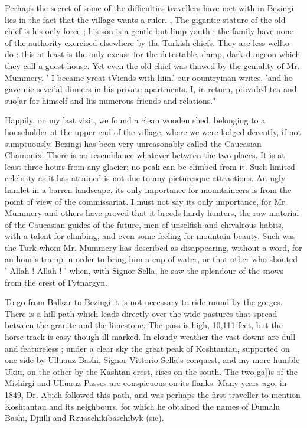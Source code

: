 \documentclass[25pt, a4paper]{article}
\begin{document}
	Perhaps the secret of some of the difficulties travellers have met with in Bezingi lies in the fact that the village wants a ruler. , The gigantic stature of the old chief is his only force ; his son is a gentle but limp youth ; the family have none of the authority exercised elsewhere by the Turkish chiefs. They are less wellto- do : this at least is the only excuse for the detestable, damp, dark dungeon which they call a guest-house. Yet even the old chief was thawed by the geniality of Mr. Mummery. ' I became yreat tViends with liiin.' our oountryinan writes, 'and ho gave nie sevei'al dinners in liis private apartments. I, in return, provided tea and suo[ar for himself and liis numerous friends and relations."
	
	Happily, on my last visit, we found a clean wooden shed, belonging to a householder at the upper end of the village, where we were lodged decently, if not sumptuously. Bezingi has been very unreasonably called the Caucasian Chamonix. There is no resemblance whatever between the two places. It is at least three hours from any glacier; no peak can be climbed from it. Such limited celebrity as it has attained is not due to any picturesque attractions. An ugly hamlet in a barren landscape, its only importance for mountaineers is from the point of view of the commissariat. I must not say its only importance, for Mr. Mummery and others have proved that it breeds hardy hunters, the raw material of the Caucasian guides of the future, men of unselfish and chivalrous habits, with a talent for climbing, and even some feeling for mountain beauty. Such was the Turk whom Mr. Mummery has described as disappearing, without a word, for an hour's tramp in order to bring him a cup of water, or that other who shouted ' Allah ! Allah ! ' when, with Signor Sella, he saw the splendour of the snows from the crest of Fytnargyn.
	
	To go from Balkar to Bezingi it is not necessary to ride round by the gorges. There is a hill-path which leads directly over the wide pastures that spread between the granite and the limestone. The pass is high, 10,111 feet, but the horse-track is easy though ill-marked. In cloudy weather the vast downs are dull and featureless ; under a clear sky the great peak of Koshtantau, supported on one side by Ulluauz Bashi, Signor Vittorio Sella's conquest, and my more humble Ukiu, on the other by the Kashtan crest, rises on the south. The two ga])s of the Mishirgi and Ulluauz Passes are conspicuous on its flanks. Many years ago, in 1849, Dr. Abich followed this path, and was perhaps the first traveller to mention Koshtantau and its neighbours, for which he obtained the names of Dumalu Bashi, Djiilli and Rzuaschikibaschibyk (sic). 
	
\end{document}
